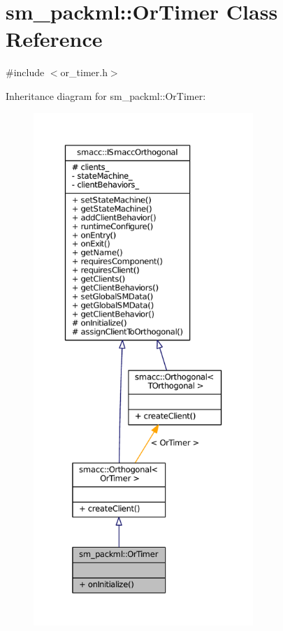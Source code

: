 \hypertarget{classsm__packml_1_1OrTimer}{}\section{sm\+\_\+packml\+:\+:Or\+Timer Class Reference}
\label{classsm__packml_1_1OrTimer}


{\ttfamily \#include $<$or\+\_\+timer.\+h$>$}



Inheritance diagram for sm\+\_\+packml\+:\+:Or\+Timer\+:
\nopagebreak
\begin{figure}[H]
\begin{center}
\leavevmode
\includegraphics[height=550pt]{classsm__packml_1_1OrTimer__inherit__graph}
\end{center}
\end{figure}


